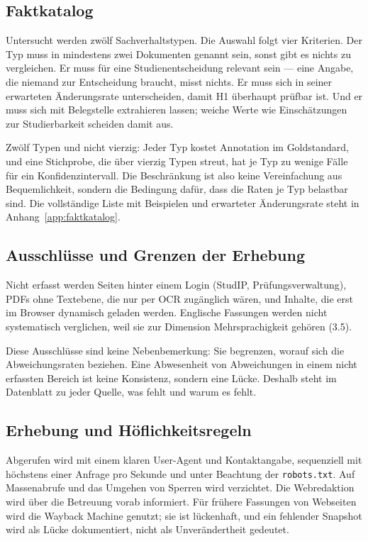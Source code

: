 \subsection{Faktkatalog}

Untersucht werden zwölf Sachverhaltstypen. Die Auswahl folgt vier Kriterien. Der Typ muss in
mindestens zwei Dokumenten genannt sein, sonst gibt es nichts zu vergleichen. Er muss für eine
Studienentscheidung relevant sein --- eine Angabe, die niemand zur Entscheidung braucht, misst
nichts. Er muss sich in seiner erwarteten Änderungsrate unterscheiden, damit H1 überhaupt
prüfbar ist. Und er muss sich mit Belegstelle extrahieren lassen; weiche Werte wie
Einschätzungen zur Studierbarkeit scheiden damit aus.

Zwölf Typen und nicht vierzig: Jeder Typ kostet Annotation im Goldstandard, und eine
Stichprobe, die über vierzig Typen streut, hat je Typ zu wenige Fälle für ein
Konfidenzintervall. Die Beschränkung ist also keine Vereinfachung aus Bequemlichkeit, sondern
die Bedingung dafür, dass die Raten je Typ belastbar sind. Die vollständige Liste mit
Beispielen und erwarteter Änderungsrate steht in Anhang~\ref{app:faktkatalog}.

\subsection{Ausschlüsse und Grenzen der Erhebung}

Nicht erfasst werden Seiten hinter einem Login (StudIP, Prüfungsverwaltung), PDFs ohne
Textebene, die nur per OCR zugänglich wären, und Inhalte, die erst im Browser dynamisch
geladen werden. Englische Fassungen werden nicht systematisch verglichen, weil sie zur
Dimension Mehrsprachigkeit gehören (3.5).

Diese Ausschlüsse sind keine Nebenbemerkung: Sie begrenzen, worauf sich die Abweichungsraten
beziehen. Eine Abwesenheit von Abweichungen in einem nicht erfassten Bereich ist keine
Konsistenz, sondern eine Lücke. Deshalb steht im Datenblatt zu jeder Quelle, was fehlt und
warum es fehlt.

\subsection{Erhebung und Höflichkeitsregeln}

Abgerufen wird mit einem klaren User-Agent und Kontaktangabe, sequenziell mit höchstens einer
Anfrage pro Sekunde und unter Beachtung der \texttt{robots.txt}. Auf Massenabrufe und das
Umgehen von Sperren wird verzichtet. Die Webredaktion wird über die Betreuung vorab
informiert. Für frühere Fassungen von Webseiten wird die Wayback Machine genutzt; sie ist
lückenhaft, und ein fehlender Snapshot wird als Lücke dokumentiert, nicht als Unverändertheit
gedeutet.
